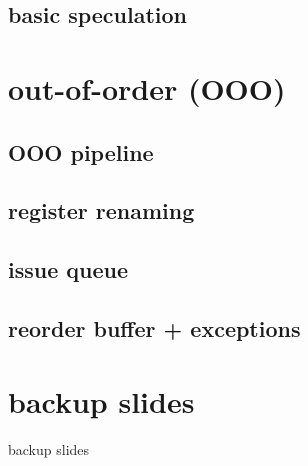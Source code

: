 \subsection{basic speculation}

\section{out-of-order (OOO)}

\subsection{OOO pipeline}

\subsection{register renaming}

\subsection{issue queue}

\subsection{reorder buffer + exceptions}

\section{backup slides}
\begin{frame}{backup slides}
\end{frame}


